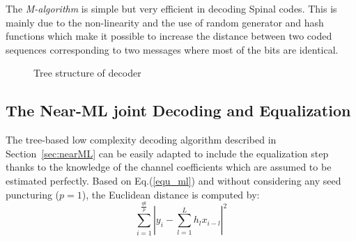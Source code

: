\documentclass[conference]{IEEEtran}
\begin{document}
The \emph{M-algorithm} is simple but very efficient in decoding Spinal codes. This is mainly due to the non-linearity and the use of random generator and hash functions which make it possible to increase the distance between two coded sequences corresponding to two messages where most of the bits are identical.
\begin{figure}
\centering
{}
\caption{Tree structure of decoder}
\label{fig_decoderTree}
\end{figure}

\subsection{The Near-ML joint Decoding and Equalization}
The tree-based low complexity decoding algorithm described in Section~\ref{sec:nearML} can be easily adapted to include the equalization step thanks to the knowledge of the channel coefficients which are assumed to be estimated perfectly. Based on Eq.(\ref{equ_ml}) and without considering any seed puncturing ($p=1$), the Euclidean distance is computed by:
\begin{equation}
\sum_{i=1}^{\frac{qk}{p}}\left\vert y_{i}-\sum_{l=1}^L h_l x_{i-l}\right\vert^2
\label{equ_costEqu}
\end{equation}
\end{document}
